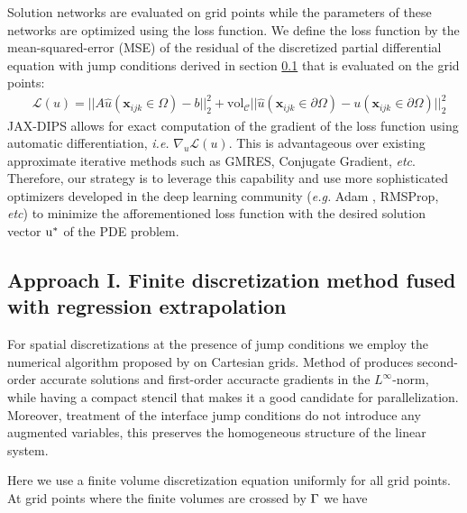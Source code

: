 \documentclass{elsarticle}
\begin{document}
Solution networks are evaluated on grid points while the parameters of these networks are optimized using the loss function. We define the loss function by the mean-squared-error (MSE) of the residual of the discretized partial differential equation with jump conditions derived in section \ref{sec::FD} that is evaluated on the grid points:
\begin{align*}
	&\mathcal{L}(u) = \vert\vert A\hat{u}(\mathbf{x}_{ijk}\in \Omega) - b\vert\vert_2^2 + \textrm{vol}_{\mathcal{C}}\vert\vert \hat{u}(\mathbf{x}_{ijk}\in\partial \Omega) - u(\mathbf{x}_{ijk}\in\partial \Omega)\vert\vert_2^2 
\end{align*}
JAX-DIPS allows for exact computation of the gradient of the loss function using automatic differentiation, \textit{i.e.} $\nabla_u \mathcal{L}(u)$. This is advantageous over existing approximate iterative methods such as GMRES, Conjugate Gradient, \textit{etc}. Therefore, our strategy is to leverage this capability and use more sophisticated optimizers developed in the deep learning community (\textit{e.g.} Adam \cite{kingma2014adam}, RMSProp, \textit{etc}) to minimize the afforementioned loss function with the desired solution vector $\rm u^\ast$ of the PDE problem.










\subsection{Approach I. Finite discretization method fused with regression extrapolation}\label{sec::FD}

For spatial discretizations at the presence of jump conditions we employ the numerical algorithm proposed by \cite{bochkov2020solving} on Cartesian grids. Method of \cite{bochkov2020solving} produces second-order accurate solutions and first-order accuracte gradients in the $L^\infty$-norm, while having a compact stencil that makes it a good candidate for parallelization. Moreover, treatment of the interface jump conditions do not introduce any augmented variables, this preserves the homogeneous structure of the linear system.

Here we use a finite volume discretization equation uniformly for all grid points. At grid points where the finite volumes are crossed by $\rm \Gamma$ we have
\end{document}

